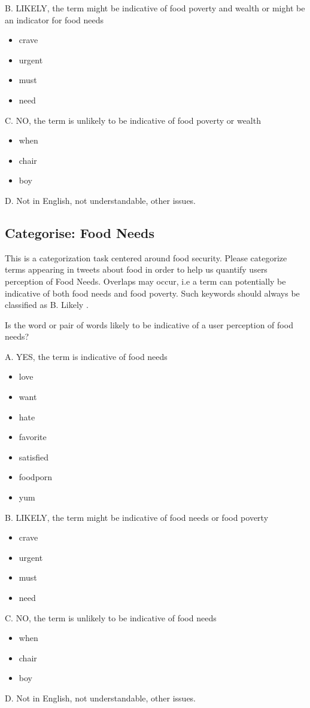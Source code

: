 B. LIKELY, the term might be indicative of food poverty and wealth or might be an indicator for food needs\begin{itemize}
  \item crave
  \item urgent
  \item must
  \item need 
\end{itemize}

C. NO, the term is unlikely to be indicative of food poverty or wealth

\begin{itemize}
  \item when
  \item chair
  \item boy
\end{itemize}

D. Not in English, not understandable, other issues.



\subsection{Categorise: Food Needs}

This is a categorization task centered around food security. Please categorize terms appearing in tweets about food in order to help us quantify users perception of Food Needs. Overlaps may occur, i.e a term can potentially be indicative of both food needs and food poverty. Such keywords should always be classified as B. Likely .

Is the word or pair of words likely to be indicative of a user perception of food needs?

A. YES, the term is indicative of food needs

\begin{itemize}
  \item love
  \item want
  \item hate
  \item favorite 
  \item satisfied
  \item foodporn
  \item yum


\end{itemize}

B. LIKELY, the term might be indicative of food needs or food poverty
\begin{itemize}
  \item crave
  \item urgent
  \item must
  \item need
\end{itemize}

C. NO, the term is unlikely to be indicative of food needs 
\begin{itemize}
  \item when
  \item chair
  \item boy
\end{itemize}

D. Not in English, not understandable, other issues.


